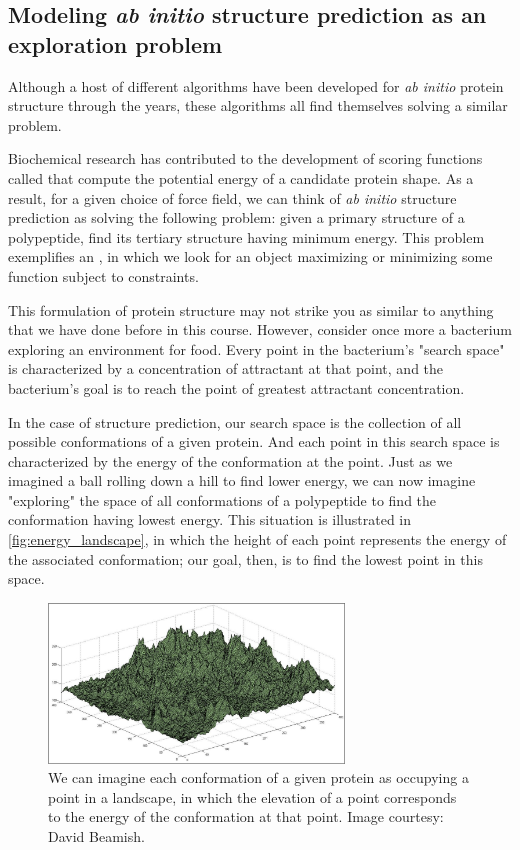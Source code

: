 {\FloatBarrier
{}
\subsection{Modeling \textit{ab initio} structure prediction as an exploration problem}

Although a host of different algorithms have been developed for \textit{ab initio} protein structure through the years, these algorithms all find themselves solving a similar problem.

Biochemical research has contributed to the development of scoring functions called  that compute the potential energy of a candidate protein shape. As a result, for a given choice of force field, we can think of \textit{ab initio} structure prediction as solving the following problem: given a primary structure of a polypeptide, find its tertiary structure having minimum energy. This problem exemplifies an , in which we look for an object maximizing or minimizing some function subject to constraints.

This formulation of protein structure may not strike you as similar to anything that we have done before in this course. However, consider once more a bacterium exploring an environment for food. Every point in the bacterium's "search space" is characterized by a concentration of attractant at that point, and the bacterium's goal is to reach the point of greatest attractant concentration.

In the case of structure prediction, our search space is the collection of all possible conformations of a given protein. And each point in this search space is characterized by the energy of the conformation at the point. Just as we imagined a ball rolling down a hill to find lower energy, we can now imagine "exploring" the space of all conformations of a polypeptide to find the conformation having lowest energy. This situation is illustrated in \autoref{fig:energy_landscape}, in which the height of each point represents the energy of the associated conformation; our goal, then, is to find the lowest point in this space.

\begin{figure}[h]
	\centering
	\mySfFamily
	\includegraphics[width = 0.7\textwidth]{../images/energy_landscape.png}
	\caption{We can imagine each conformation of a given protein as occupying a point in a landscape, in which the elevation of a point corresponds to the energy of the conformation at that point. Image courtesy: David Beamish.}
	\label{fig:energy_landscape}
\end{figure}

}
